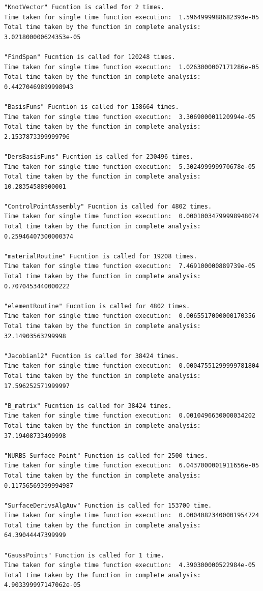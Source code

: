 \documentclass[11pt]{article}
\begin{document}
\begin{verbatim}
"KnotVector" Fucntion is called for 2 times.
Time taken for single time function execution:  1.5964999988682393e-05
Total time taken by the function in complete analysis:  3.021800000624353e-05

"FindSpan" Fucntion is called for 120248 times.
Time taken for single time function execution:  1.0263000007171286e-05
Total time taken by the function in complete analysis:  0.44270469899998943

"BasisFuns" Fucntion is called for 158664 times.
Time taken for single time function execution:  3.306900001120994e-05
Total time taken by the function in complete analysis:  2.1537873399999796

"DersBasisFuns" Fucntion is called for 230496 times.
Time taken for single time function execution:  5.302499999970678e-05
Total time taken by the function in complete analysis:  10.28354588900001

"ControlPointAssembly" Fucntion is called for 4802 times.
Time taken for single time function execution:  0.00010034799998948074
Total time taken by the function in complete analysis:  0.25946407300000374

"materialRoutine" Fucntion is called for 19208 times.
Time taken for single time function execution:  7.469100000889739e-05
Total time taken by the function in complete analysis:  0.7070453440000222

"elementRoutine" Fucntion is called for 4802 times.
Time taken for single time function execution:  0.0065517000000170356
Total time taken by the function in complete analysis:  32.14903563299998

"Jacobian12" Fucntion is called for 38424 times.
Time taken for single time function execution:  0.00047551299999781804
Total time taken by the function in complete analysis:  17.596252571999997

"B_matrix" Fucntion is called for 38424 times.
Time taken for single time function execution:  0.0010496630000034202
Total time taken by the function in complete analysis:  37.19408733499998

"NURBS_Surface_Point" Function is called for 2500 times.
Time taken for single time function execution:  6.0437000001911656e-05
Total time taken by the function in complete analysis:  0.11756569399994987

"SurfaceDerivsAlgAuv" Function is called for 153700 time.
Time taken for single time function execution:  0.00040823400001954724
Total time taken by the function in complete analysis:  64.39044447399999

"GaussPoints" Function is called for 1 time.
Time taken for single time function execution:  4.390300000522984e-05
Total time taken by the function in complete analysis:  4.903399997147062e-05
\end{verbatim}
\end{document}

